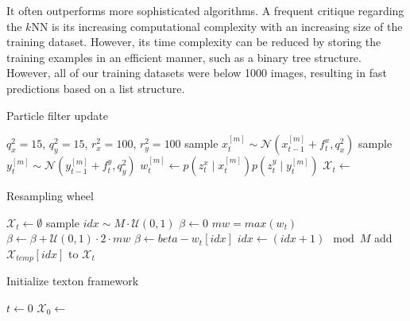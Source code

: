 
It often outperforms more sophisticated algorithms. A frequent critique regarding the $k$NN is its increasing computational complexity with an increasing size of the training dataset. However, its time complexity can be reduced by storing the training examples in an efficient manner, such as a binary tree structure. However, all of our training datasets were below 1000 images, resulting in fast predictions based on a list structure. 


\begin{algorithm}
\caption{{Particle filter update}}
\label{alg:particle_filter}
\begin{algorithmic}[1]
  \State $q_x^2 = 15$, $q_y^2 = 15$, $r_x^2 = 100$, $r_y^2 = 100$
  \State sample $x_t^{[m]} \sim \mathcal{N}(x_{t-1}^{[m]} + f_t^x, q_x^2)$
  \State sample $y_t^{[m]} \sim \mathcal{N}(y_{t-1}^{[m]} + f_t^y, q_y^2)$
  \State $w_t^{[m]} \gets p(z_t^x \mid x_t^{[m]}) p(z_t^y \mid y_t^{[m]})$
  \EndFor
  \State $\mathcal{X}_t \gets$ 
  \EndProcedure
\end{algorithmic}
\end{algorithm}

\begin{algorithm}
\caption{{Resampling wheel}}
\label{alg:resampling_wheel}
  \begin{algorithmic}[1]
    \State $\mathcal{X}_t \gets \emptyset$
    \State sample $idx \sim M\cdot\mathcal{U}(0, 1)$
    \State $\beta \gets 0$
    \State $mw = max(w_t)$
    \State $\beta \gets \beta + \mathcal{U}(0, 1)\cdot 2\cdot mw$
    \State $\beta \gets beta - w_t[idx]$
    \State $idx \gets (idx + 1) \mod M$
    \EndWhile
    \State add $\mathcal{X}_{temp}[idx]$ to $\mathcal{X}_t$
    \EndFor
\EndProcedure
  \end{algorithmic}
\end{algorithm}

\begin{algorithm}
\caption{{Initialize texton framework}}
\label{alg:trexton_init}
  \begin{algorithmic}[1]
    \State $t \gets 0$ 
    \State $\mathcal{X}_0 \gets$ 
    \EndProcedure
  \end{algorithmic}
\end{algorithm}


